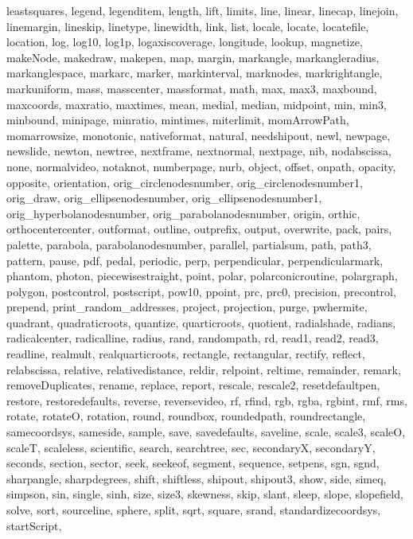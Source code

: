 {{  leastsquares, legend, legenditem, length, lift, limits, line, linear,
  linecap, linejoin, linemargin, lineskip, linetype, linewidth, link, list,
  locale, locate, locatefile, location, log, log10, log1p, logaxiscoverage,
  longitude, lookup, magnetize, makeNode, makedraw, makepen, map, margin,
  markangle, markangleradius, markanglespace, markarc, marker, markinterval,
  marknodes, markrightangle, markuniform, mass, masscenter, massformat, math,
  max, max3, maxbound, maxcoords, maxratio, maxtimes, mean, medial, median,
  midpoint, min, min3, minbound, minipage, minratio, mintimes, miterlimit,
  momArrowPath, momarrowsize, monotonic, nativeformat, natural, needshipout,
  newl, newpage, newslide, newton, newtree, nextframe, nextnormal, nextpage,
  nib, nodabscissa, none, normalvideo, notaknot, numberpage, nurb, object,
  offset, onpath, opacity, opposite, orientation, orig_circlenodesnumber,
  orig_circlenodesnumber1, orig_draw, orig_ellipsenodesnumber,
  orig_ellipsenodesnumber1, orig_hyperbolanodesnumber,
  orig_parabolanodesnumber, origin, orthic, orthocentercenter, outformat,
  outline, outprefix, output, overwrite, pack, pairs, palette, parabola,
  parabolanodesnumber, parallel, partialsum, path, path3, pattern, pause, pdf,
  pedal, periodic, perp, perpendicular, perpendicularmark, phantom, photon,
  piecewisestraight, point, polar, polarconicroutine, polargraph, polygon,
  postcontrol, postscript, pow10, ppoint, prc, prc0, precision, precontrol,
  prepend, print_random_addresses, project, projection, purge, pwhermite,
  quadrant, quadraticroots, quantize, quarticroots, quotient, radialshade,
  radians, radicalcenter, radicalline, radius, rand, randompath, rd, read1,
  read2, read3, readline, realmult, realquarticroots, rectangle, rectangular,
  rectify, reflect, relabscissa, relative, relativedistance, reldir, relpoint,
  reltime, remainder, remark, removeDuplicates, rename, replace, report,
  rescale, rescale2, resetdefaultpen, restore, restoredefaults, reverse,
  reversevideo, rf, rfind, rgb, rgba, rgbint, rmf, rms, rotate, rotateO,
  rotation, round, roundbox, roundedpath, roundrectangle, samecoordsys,
  sameside, sample, save, savedefaults, saveline, scale, scale3, scaleO,
  scaleT, scaleless, scientific, search, searchtree, sec, secondaryX,
  secondaryY, seconds, section, sector, seek, seekeof, segment, sequence,
  setpens, sgn, sgnd, sharpangle, sharpdegrees, shift, shiftless, shipout,
  shipout3, show, side, simeq, simpson, sin, single, sinh, size, size3,
  skewness, skip, slant, sleep, slope, slopefield, solve, sort, sourceline,
  sphere, split, sqrt, square, srand, standardizecoordsys, startScript,
}}
